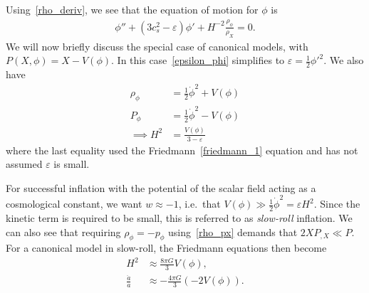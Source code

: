 Using~\eqref{rho_deriv}, we see that
the equation of motion for $\phi$ is~\cite{Hu_2011}
\begin{align}\label{phieom}
    \phi''+(3c_s^2-\varepsilon)\phi'+H^{-2}\frac{\rho_\phi}{\rho_X}=0.
\end{align}
We will now briefly discuss the special case of canonical models,
with $P(X,\phi)=X-V(\phi)$.
In this case~\eqref{epsilon_phi} simplifies to
$\varepsilon = \frac{1}{2}{\phi'}^2$.
    We also have
    \begin{align}
        \rho_\phi &= \frac{1}{2}\dot{\phi}^2+V(\phi)\\
        P_\phi &= \frac{1}{2}\dot{\phi}^2-V(\phi)\\
        \implies H^2 &= \frac{V(\phi)}{3-\varepsilon}
    \end{align}
    where the last equality used the Friedmann~\eqref{friedmann_1} equation and
    has not assumed $\varepsilon$ is small.


    For successful inflation with the potential of the scalar field acting as a
    cosmological constant, we want $w\approx-1$,
    i.e.\ that $V(\phi)\gg\frac{1}{2}\dot{\phi}^2=\varepsilon H^2$. Since the kinetic term is required to
    be small, this is referred to as \textit{slow-roll} inflation.
We can also see that requiring $\rho_\phi=-p_\phi$ using~\eqref{rho_px} demands that
$2XP_{,X}\ll P$.
    For a canonical model in slow-roll,
    the Friedmann equations then become
    \begin{align}
        H^2 &\approx \frac{8\pi G}{3}V(\phi),\\
        \frac{\ddot{a}}{a} &\approx -\frac{4\pi G}{3}\left(-2V(\phi)\right).
    \end{align}

